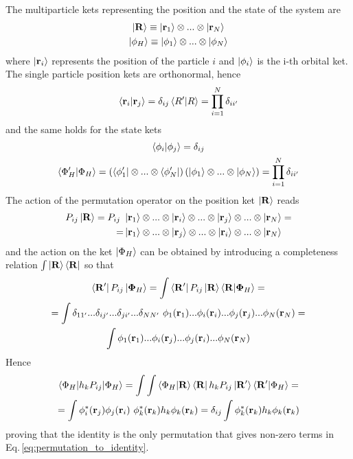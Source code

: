 The multiparticle kets representing the position and the state of the system are
\begin{gather*}
    \ket{\ve R} \equiv \ket{\ve r_1} \otimes ... \otimes \ket{\ve r_N} \\
    \ket{\ve \phi_H} \equiv \ket{\phi_1} \otimes ... \otimes \ket{\phi_N}
\end{gather*}
where $\ket{\ve r_i}$ represents the position of the particle $i$ and $\ket{\ve \phi_i}$ is the i-th orbital ket. \\
The single particle position kets are orthonormal, hence
\begin{equation*}
    \bracket{\ve r_i}{\ve r_j} = \delta_{ij} 
    \bracket{R'}{R} = \prod_{i=1}^N \delta_{ii'}
\end{equation*}
and the same holds for the state kets
\begin{gather*}
    \bracket{\phi_i}{\phi_j} = \delta_{ij} \\
    \bracket{\Phi_H'}{\Phi_H} = \left(\bra{\phi_1'} \otimes ... \otimes \bra{\phi_N'}\right)\left(\ket{\phi_1} \otimes ... \otimes \ket{\phi_N}\right) = \prod_{i=1}^N \delta_{ii'}
\end{gather*}
The action of the permutation operator on the position ket $\ket{\ve R}$ reads
\begin{align*}
    P_{ij}\ket{\ve R} = P_{ij} \ &\ket{\ve r_1} \otimes ...  \otimes \ket{\ve r_i} \otimes ... \otimes \ket{\ve r_j} \otimes ... \otimes \ket{\ve r_N} = \\
    = &\ket{\ve r_1} \otimes ...  \otimes \ket{\ve r_j} \otimes ... \otimes \ket{\ve r_i} \otimes ... \otimes \ket{\ve r_N}
\end{align*}
and the action on the ket $\ket{\Phi_H}$ can be obtained by introducing a completeness relation $\int \ket{\ve R}\bra{\ve R}$ so that
\begin{gather*}
   \bra{\ve{R'}}P_{ij}\ket{\ve \Phi_H} = \int \bra{\ve R'}P_{ij}\ket{\ve R}\bra{\ve R}\ket{\ve \Phi_H} = \\
   = \int \delta_{11'}...\delta_{ij'}...\delta_{ji'}...\delta_{NN'} \ \phi_1(\ve r_1)...\phi_i(\ve r_i)...\phi_j(\ve r_j)...\phi_N(\ve r_N) = \\
   \int \phi_1(\ve r_1)...\phi_i(\ve r_j)...\phi_j(\ve r_i)...\phi_N(\ve r_N)
\end{gather*}
Hence
\begin{gather*}
    \bracketOP{\Phi_H}{\Phi_H}{h_k P_{ij}} = \int\int \bra{\Phi_H}\ket{\ve R}\bra{\ve R}h_kP_{ij}\ket{\ve R'}\bracket{\ve R'}{\Phi_H} = \\ 
    = \int \phi_i^*(\ve r_j) \phi_j(\ve r_i) \ \phi_k^*(\ve r_k)h_k\phi_k(\ve r_k) = \delta_{ij} \int \phi_k^*(\ve r_k)h_k\phi_k(\ve r_k)
\end{gather*}
proving that the identity is the only permutation that gives non-zero terms in Eq.\,\ref{eq:permutation_to_identity}.